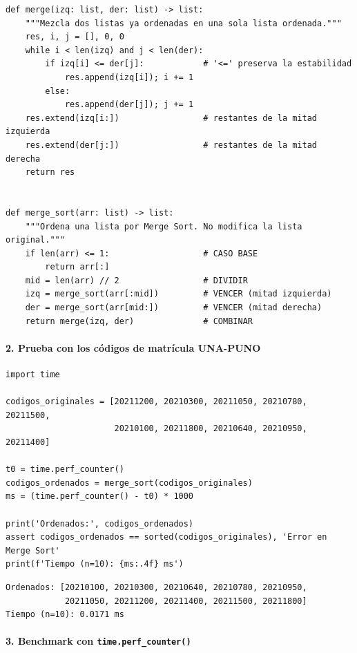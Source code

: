 \documentclass[12pt,a4paper]{article}
\begin{document}
\begin{lstlisting}[style=python,caption={\texttt{merge\_sort(arr)} y \texttt{merge(izq, der)}.}]
def merge(izq: list, der: list) -> list:
    """Mezcla dos listas ya ordenadas en una sola lista ordenada."""
    res, i, j = [], 0, 0
    while i < len(izq) and j < len(der):
        if izq[i] <= der[j]:            # '<=' preserva la estabilidad
            res.append(izq[i]); i += 1
        else:
            res.append(der[j]); j += 1
    res.extend(izq[i:])                 # restantes de la mitad izquierda
    res.extend(der[j:])                 # restantes de la mitad derecha
    return res


def merge_sort(arr: list) -> list:
    """Ordena una lista por Merge Sort. No modifica la lista original."""
    if len(arr) <= 1:                   # CASO BASE
        return arr[:]
    mid = len(arr) // 2                 # DIVIDIR
    izq = merge_sort(arr[:mid])         # VENCER (mitad izquierda)
    der = merge_sort(arr[mid:])         # VENCER (mitad derecha)
    return merge(izq, der)              # COMBINAR
\end{lstlisting}

\paragraph{2. Prueba con los códigos de matrícula UNA-PUNO}\mbox{}

\begin{lstlisting}[style=python,caption={Prueba funcional con la lista de códigos de matrícula.}]
import time

codigos_originales = [20211200, 20210300, 20211050, 20210780, 20211500,
                      20210100, 20211800, 20210640, 20210950, 20211400]

t0 = time.perf_counter()
codigos_ordenados = merge_sort(codigos_originales)
ms = (time.perf_counter() - t0) * 1000

print('Ordenados:', codigos_ordenados)
assert codigos_ordenados == sorted(codigos_originales), 'Error en Merge Sort'
print(f'Tiempo (n=10): {ms:.4f} ms')
\end{lstlisting}

\begin{lstlisting}[style=consola,caption={Salida de consola.}]
Ordenados: [20210100, 20210300, 20210640, 20210780, 20210950,
            20211050, 20211200, 20211400, 20211500, 20211800]
Tiempo (n=10): 0.0171 ms
\end{lstlisting}

\paragraph{3. Benchmark con \texttt{time.perf\_counter()}}\mbox{}
\end{document}
